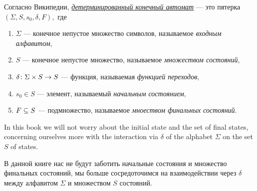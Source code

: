 \documentclass[CT4S-EN-RU]{subfiles}
\begin{document}
\begin{blockRUS}
Согласно Википедии, \href{https://ru.wikipedia.org/wiki/%D0%9A%D0%BE%D0%BD%D0%B5%D1%87%D0%BD%D1%8B%D0%B9_%D0%B0%D0%B2%D1%82%D0%BE%D0%BC%D0%B0%D1%82#.D0.94.D0.B5.D1.82.D0.B5.D1.80.D0.BC.D0.B8.D0.BD.D0.B8.D1.80.D0.BE.D0.B2.D0.B0.D0.BD.D0.BD.D0.BE.D1.81.D1.82.D1.8C}{\em детерминированный конечный автомат} — это пятерка $(\Sigma,S,s_0,\delta,F),$ где
\begin{enumerate}
\item $\Sigma$ — конечное непустое множество символов, называемое {\em входным алфавитом},
\item $S$ — конечное непустое множество, называемое {\em множеством состояний},
\item $\delta\taking \Sigma\times S\to S$ — функция, называемая {\em функцией переходов},
\item $s_0\in S$ — элемент, называемый {\em начальным состоянием},
\item $F\ss S$ — подмножество, называемое {\em мноеством финальных состояний}.
\end{enumerate}
\end{blockRUS}

\begin{blockENG}
In this book we will not worry about the initial state and the set of final states, concerning ourselves more with the interaction via $\delta$ of the alphabet $\Sigma$ on the set $S$ of states.
\end{blockENG}

\begin{blockRUS}
В данной книге нас не будут заботить начальные состояния и множество финальных состояний, мы больше сосредоточимся на взаимодействии через $\delta$ между алфавитом $\Sigma$ и множеством $S$ состояний.
\end{blockRUS}
\end{document}
